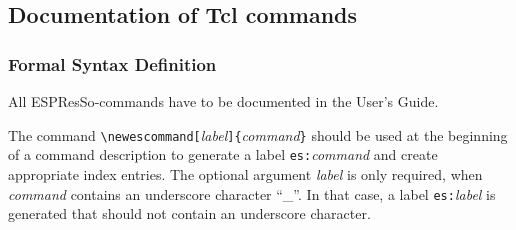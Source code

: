 \documentclass[
a4paper,                        %
11pt,                           %
twoside,                        %
footsepline,                    %
headsepline,                    %
headexclude,                    %
footexclude,                    %
pagesize,                       %
bibtotocnumbered,               %
idxtotoc                        %
]{scrreprt}
\newcommand{\es}{\mbox{\textsf{ESPResSo}}\xspace}
\begin{document}
\subsection{Documentation of Tcl commands}
\label{tcl_docs}

\subsubsection{Formal Syntax Definition}

All \es-commands have to be documented in the User's Guide.

The command
\verb!\newescommand[!\textit{label}\verb!]{!\textit{command}\verb!}!
should be used at the beginning of a command description to generate a
label \verb!es:!\textit{command} and create appropriate index
entries. The optional argument \textit{label} is only required, when
\textit{command} contains an underscore character ``\_''. In that
case, a label \verb!es:!\textit{label} is generated that should not
contain an underscore character.
\end{document}
